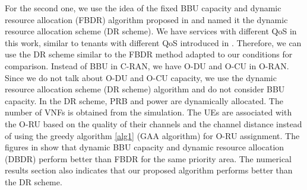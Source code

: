 \documentclass[lettersize,journal]{IEEEtran}
\begin{document}
For the second one, we use the idea of the fixed BBU capacity and dynamic resource allocation (FBDR) algorithm proposed in \cite{lee2018dynamic} and named it the dynamic resource allocation scheme (DR scheme). 
 We have services with different QoS in this work, similar to tenants with different QoS introduced in \cite{lee2018dynamic}. Therefore, we can use the DR scheme similar to the FBDR method adapted to our conditions for comparison. Instead of BBU in C-RAN, we have O-DU and O-CU in O-RAN.
 Since we do not talk about O-DU and O-CU capacity, we use the dynamic resource allocation scheme (DR scheme) algorithm and do not consider BBU capacity.
 In the DR scheme, PRB and power are dynamically allocated. The number of VNFs is obtained from the simulation. The UEs are associated with the O-RU based on the quality of their channels and the channel distance instead of using the greedy algorithm \ref{alg1} (GAA algorithm) for O-RU assignment. The figures in \cite{lee2018dynamic} show that dynamic BBU capacity and dynamic resource allocation (DBDR) perform better than FBDR for the same priority area. The numerical results section also indicates that our proposed algorithm performs better than the DR scheme.
\vspace*{-0.9em}
\end{document}
